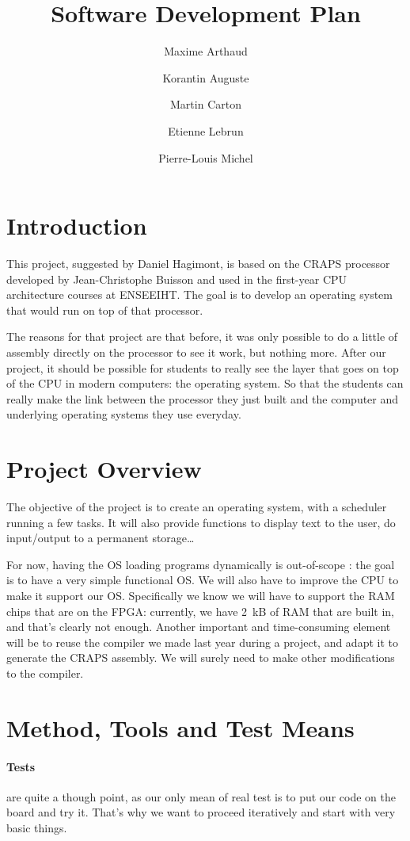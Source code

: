 \documentclass{article}
\title{Software Development Plan}
\author{
       Maxime Arthaud
  \and Korantin Auguste
  \and Martin Carton
  \and Etienne Lebrun
  \and Pierre-Louis Michel
}
\begin{document}
  \maketitle
  \tableofcontents
  \newpage

  \section{Introduction}
    This project, suggested by Daniel Hagimont, is based on the CRAPS processor
    developed by Jean-Christophe Buisson and used in the first-year CPU
    architecture courses at ENSEEIHT. The goal is to develop an operating
    system that would run on top of that processor.

    The reasons for that project are that before, it was only possible to do a
    little of assembly directly on the processor to see it work, but nothing
    more.  After our project, it should be possible for students to really see
    the layer that goes on top of the CPU in modern computers: the operating
    system. So that the students can really make the link between the processor
    they just built and the computer and underlying operating systems they use
    everyday.


  \section{Project Overview}
    The objective of the project is to create an operating system, with a
    scheduler running a few tasks. It will also provide functions to display
    text to the user, do input/output to a permanent storage\dots

    For now, having the OS loading programs dynamically is out-of-scope : the
    goal is to have a very simple functional OS.  We will also have to improve
    the CPU to make it support our OS. Specifically we know we will have to
    support the RAM chips that are on the FPGA: currently, we have \SI{2}{kB}
    of RAM that are built in, and that's clearly not enough. Another important
    and time-consuming element will be to reuse the compiler we made last year
    during a project, and adapt it to generate the CRAPS assembly. We will
    surely need to make other modifications to the compiler.

  \section{Method, Tools and Test Means}
    \paragraph{Tests} are quite a though point, as our only mean of real test is
    to put our code on the board and try it. That's why we want to proceed
    iteratively and start with very basic things.
\end{document}
